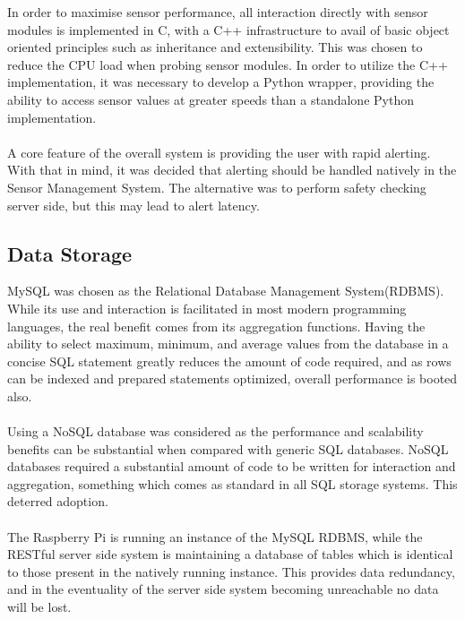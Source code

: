 \documentclass{article}
\begin{document}
In order to maximise sensor performance, all interaction directly with sensor modules is implemented in C, with a C++ infrastructure to avail of basic object oriented principles such as inheritance and extensibility. This was chosen to reduce the CPU load when probing sensor modules. In order to utilize the C++ implementation, it was necessary to develop a Python wrapper, providing the ability to access sensor values at greater speeds than a standalone Python implementation. \\\\
A core feature of the overall system is providing the user with rapid alerting. With that in mind, it was decided that alerting should be handled natively in the Sensor Management System. The alternative was to perform safety checking server side, but this may lead to alert latency.
\subsection{Data Storage}
MySQL was chosen as the Relational Database Management System(RDBMS). While its use and interaction is facilitated in most modern programming languages, the real benefit comes from its aggregation functions. Having the ability to select maximum, minimum, and average values from the database in a concise SQL statement greatly reduces the amount of code required, and as rows can be indexed and prepared statements optimized, overall performance is booted also. \\\\
Using a NoSQL database was considered as the performance and scalability benefits can be substantial when compared with generic SQL databases. NoSQL databases required a substantial amount of code to be written for interaction and aggregation, something which comes as standard in all SQL storage systems. This deterred adoption. \\\\
The Raspberry Pi is running an instance of the MySQL RDBMS, while the RESTful server side system is maintaining a database of tables which is identical to those present in the natively running instance. This provides data redundancy, and in the eventuality of the server side system becoming unreachable no data will be lost.
\end{document}
